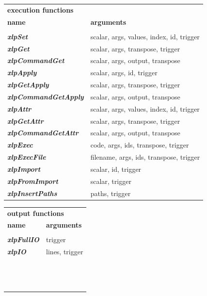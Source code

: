 \begin{figure}
\begin{minipage}[t]{.55\linewidth}
\begin{tabular}{ll}
\multicolumn{2}{l}{\textbf{\textcolor{mred}{execution functions}}} \\
\textbf{\textcolor{mblue}{name}} & \textbf{\textcolor{mblue}{arguments}}  \\
\hline\\
{\sl \bf xlpSet} &  scalar, args, values, index, id, trigger\\
{\sl \bf xlpGet} & scalar, args, transpose, trigger \\
{\sl \bf xlpCommandGet} & scalar, args, output, transpose\\
{\sl \bf xlpApply} &  scalar, args, id, trigger\\
{\sl \bf xlpGetApply} & scalar, args, transpose, trigger \\
{\sl \bf xlpCommandGetApply} & scalar, args, output, transpose\\
{\sl \bf xlpAttr} &  scalar, args, values, index, id, trigger\\
{\sl \bf xlpGetAttr} & scalar, args, transpose, trigger \\
{\sl \bf xlpCommandGetAttr} & scalar, args, output, transpose\\
{\sl \bf xlpExec} & code, args, ids, transpose, trigger \\
{\sl \bf xlpExecFile} & filename, args, ids, transpose, trigger \\
{\sl \bf xlpImport} & scalar, id, trigger \\
{\sl \bf xlpFromImport} & scalar, trigger \\
{\sl \bf xlpInsertPaths} & paths, trigger \\
\end{tabular}
\end{minipage}\hfill
\begin{minipage}[t]{.30\linewidth}
\begin{tabular}{ll}
\multicolumn{2}{l}{\textbf{\textcolor{mred}{output functions}}} \\
\textbf{\textcolor{mblue}{name}} & \textbf{\textcolor{mblue}{arguments}}  \\
\hline\\
{\sl \bf xlpFullIO} &  trigger\\
{\sl \bf xlpIO} & lines, trigger \\
& \\
& \\
& \\
& \\
& \\
& \\
& \\
& \\
& \\
& \\
& \\
& \\
& 
\end{tabular}
\end{minipage}
\vspace{10mm}


\end{figure}
